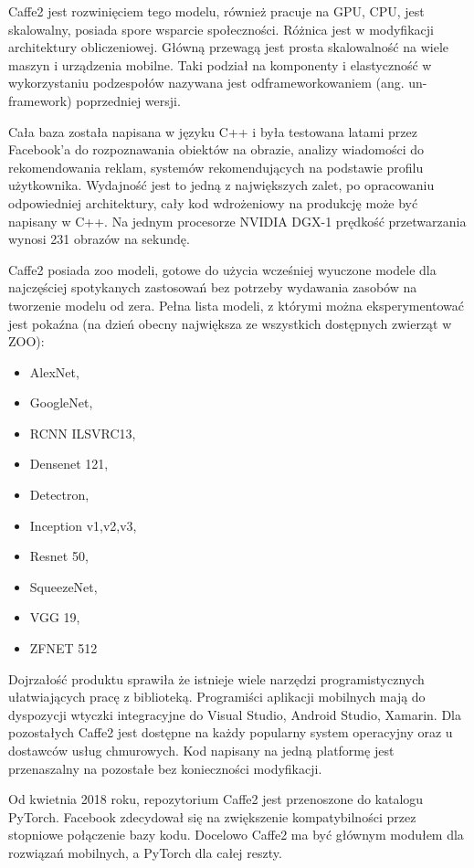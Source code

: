 \documentclass[12pt,a4paper,twoside,titlepage,openright]{book}
\begin{document}
Caffe2 jest rozwinięciem tego modelu, również pracuje na GPU, CPU, jest skalowalny, posiada spore wsparcie społeczności. Różnica jest w modyfikacji architektury obliczeniowej. Główną przewagą jest prosta skalowalność na wiele maszyn i urządzenia mobilne. Taki podział na komponenty i elastyczność w wykorzystaniu podzespołów nazywana jest odframeworkowaniem (ang. un-framework) poprzedniej wersji.
\cite{DBLP:journals/corr/JiaSDKLGGD14}

Cała baza została napisana w języku C++ i była testowana latami przez Facebook'a do rozpoznawania obiektów na obrazie, analizy wiadomości do rekomendowania reklam, systemów rekomendujących na podstawie profilu użytkownika. Wydajność jest to jedną z największych zalet, po opracowaniu odpowiedniej architektury, cały kod wdrożeniowy na produkcję może być napisany w C++. Na jednym procesorze NVIDIA DGX-1 prędkość przetwarzania wynosi 231 obrazów na sekundę.\cite{siteNvidiaCaffe2}

Caffe2 posiada zoo modeli, gotowe do użycia wcześniej wyuczone modele dla najczęściej spotykanych zastosowań bez potrzeby wydawania zasobów na tworzenie modelu od zera. Pełna lista modeli, z którymi można eksperymentować jest pokaźna (na dzień obecny największa ze wszystkich dostępnych zwierząt w ZOO):
\begin{itemize}
\item AlexNet,
\item GoogleNet,
\item RCNN ILSVRC13,
\item Densenet 121,
\item Detectron,
\item Inception v1,v2,v3,
\item Resnet 50,
\item SqueezeNet,
\item VGG 19,
\item ZFNET 512
\end{itemize}

Dojrzałość produktu sprawiła że istnieje wiele narzędzi programistycznych ułatwiających pracę z biblioteką. Programiści aplikacji mobilnych mają do dyspozycji wtyczki integracyjne do Visual Studio, Android Studio, Xamarin. Dla pozostałych Caffe2 jest dostępne na każdy popularny system operacyjny oraz u dostawców usług chmurowych. Kod napisany na jedną platformę jest przenaszalny na pozostałe bez konieczności modyfikacji.

Od kwietnia 2018 roku, repozytorium Caffe2 jest przenoszone do katalogu PyTorch. Facebook zdecydował się na zwiększenie kompatybilności przez stopniowe połączenie bazy kodu. Docelowo Caffe2 ma być głównym modułem dla rozwiązań mobilnych, a PyTorch dla całej reszty.
\end{document}
